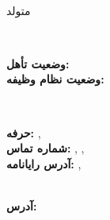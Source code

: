 \documentclass{./../lib/curriculumVitae}
\begin{document}
\iftoggle{Dev}{\par}{}
\noindent\parbox{56mm}
{\parbox{56mm}{\centering\Huge\bfseries\color{cyan}\fullName}\\\parbox{56mm}{\centering متولد \bornData}}\parbox{2mm}{\ }\parbox{40mm}
{\textbf{وضعیت تأهل:} \maritalStatus\\\textbf{وضعیت نظام وظیفه:} \militaryService}\parbox{2mm}{\ }\parbox{90mm}
{\textbf{حرفه:} \ProfessionI, \ProfessionII\\\textbf{شماره تماس:} \mobilePhoneI, \mobilePhoneII, \phoneNumber\\\textbf{آدرس رایانامه:} \emailI, \emailII}\\
\textbf{آدرس:} \fullAddress\\

\descriptions

\education

\workExperience

\teaching

\project

\publication

\LicensesCertifications

\honorsAwards

\training

\languageS

\craft

\voluntary
\end{document}

